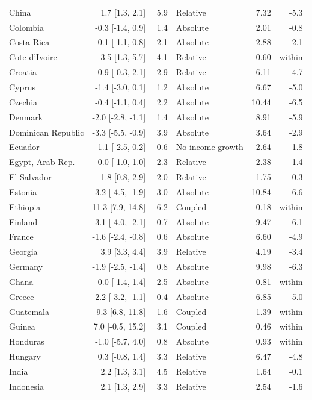 \begin{longtable}{@{}lrrlrr@{}}
China & 1.7 [1.3, 2.1] & 5.9 & Relative & 7.32 & -5.3 \\
Colombia & -0.3 [-1.4, 0.9] & 1.4 & Absolute & 2.01 & -0.8 \\
Costa Rica & -0.1 [-1.1, 0.8] & 2.1 & Absolute & 2.88 & -2.1 \\
Cote d'Ivoire & 3.5 [1.3, 5.7] & 4.1 & Relative & 0.60 & within \\
Croatia & 0.9 [-0.3, 2.1] & 2.9 & Relative & 6.11 & -4.7 \\
Cyprus & -1.4 [-3.0, 0.1] & 1.2 & Absolute & 6.67 & -5.0 \\
Czechia & -0.4 [-1.1, 0.4] & 2.2 & Absolute & 10.44 & -6.5 \\
Denmark & -2.0 [-2.8, -1.1] & 1.4 & Absolute & 8.91 & -5.9 \\
Dominican Republic & -3.3 [-5.5, -0.9] & 3.9 & Absolute & 3.64 & -2.9 \\
Ecuador & -1.1 [-2.5, 0.2] & -0.6 & No income growth & 2.64 & -1.8 \\
Egypt, Arab Rep. & 0.0 [-1.0, 1.0] & 2.3 & Relative & 2.38 & -1.4 \\
El Salvador & 1.8 [0.8, 2.9] & 2.0 & Relative & 1.75 & -0.3 \\
Estonia & -3.2 [-4.5, -1.9] & 3.0 & Absolute & 10.84 & -6.6 \\
Ethiopia & 11.3 [7.9, 14.8] & 6.2 & Coupled & 0.18 & within \\
Finland & -3.1 [-4.0, -2.1] & 0.7 & Absolute & 9.47 & -6.1 \\
France & -1.6 [-2.4, -0.8] & 0.6 & Absolute & 6.60 & -4.9 \\
Georgia & 3.9 [3.3, 4.4] & 3.9 & Relative & 4.19 & -3.4 \\
Germany & -1.9 [-2.5, -1.4] & 0.8 & Absolute & 9.98 & -6.3 \\
Ghana & -0.0 [-1.4, 1.4] & 2.5 & Absolute & 0.81 & within \\
Greece & -2.2 [-3.2, -1.1] & 0.4 & Absolute & 6.85 & -5.0 \\
Guatemala & 9.3 [6.8, 11.8] & 1.6 & Coupled & 1.39 & within \\
Guinea & 7.0 [-0.5, 15.2] & 3.1 & Coupled & 0.46 & within \\
Honduras & -1.0 [-5.7, 4.0] & 0.8 & Absolute & 0.93 & within \\
Hungary & 0.3 [-0.8, 1.4] & 3.3 & Relative & 6.47 & -4.8 \\
India & 2.2 [1.3, 3.1] & 4.5 & Relative & 1.64 & -0.1 \\
Indonesia & 2.1 [1.3, 2.9] & 3.3 & Relative & 2.54 & -1.6 \\

\end{longtable}
